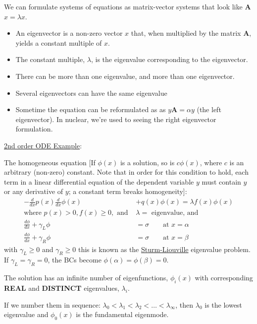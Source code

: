 \documentclass[12pt]{article}
\newcommand{\ve}[1]{\ensuremath{\mathbf{#1}}}
\begin{document}
We can formulate systems of equations as matrix-vector systems that look like \ve{A}$x = \lambda x$. 
\begin{itemize}
\item An eigenvector is a non-zero vector $x$ that, when multiplied by the matrix \ve{A}, yields a constant multiple of $x$. 
\item The constant multiple, $\lambda$, is the eigenvalue corresponding to the eigenvector.
\item There can be more than one eigenvalue, and more than one eigenvector. 
\item Several eigenvectors can have the same eigenvalue
\item Sometime the equation can be reformulated as as $y\ve{A} = \alpha y$ (the left eigenvector). In nuclear, we're used to seeing the right eigenvector formulation.
\end{itemize}

\vspace*{1em}
\noindent \underline{2nd order ODE Example}:

The homogeneous equation [If  $\phi(x)$  is a solution, so is  $c \phi(x)$, where $c$ is an arbitrary (non-zero) constant. Note that in order for this condition to hold, each term in a linear differential equation of the dependent variable $y$ must contain $y$ or any derivative of $y$; a constant term breaks homogeneity]:
%
\begin{align}
-\frac{d}{dx}p(x) \frac{d}{dx}\phi(x) &+ q(x)\phi(x) = \lambda f(x) \phi(x) \nonumber \\
\text{where }p(x) > 0, f(x) \geq 0, \text{ and }& \lambda = \text{ eigenvalue, and}\nonumber \\
\frac{d\phi}{dx} + \gamma_L \phi &= \sigma \qquad \text{at }x=\alpha \nonumber \\
\frac{d\phi}{dx} + \gamma_R \phi &= \sigma \qquad \text{at }x=\beta \nonumber
\end{align}
%
with $\gamma_L \geq 0$ and $\gamma_R \geq 0$ this is known as the \underline{Sturm-Liouville} eigenvalue problem. If $\gamma_L = \gamma_R = 0$, the BCs become $\phi(\alpha) = \phi(\beta) = 0$.

The solution has an infinite number of eigenfunctions, $\phi_i(x)$ with corresponding \textbf{REAL} and \textbf{DISTINCT} eigenvalues, $\lambda_i$. 

If we number them in sequence: $\lambda_0 < \lambda_1 < \lambda_2 < \dots < \lambda_{\infty}$, then $\lambda_0$ is the lowest eigenvalue and $\phi_0(x)$ is the fundamental eigenmode. 
\end{document}
